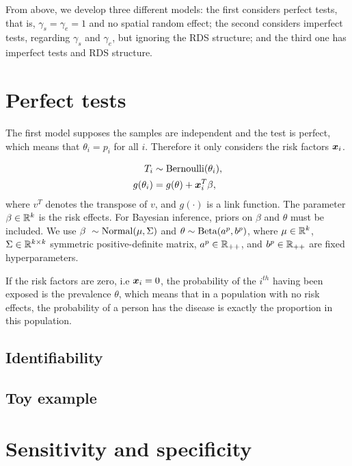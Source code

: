 From above, we develop three different models: the first considers perfect 
tests, that is, $\gamma_s = \gamma_e = 1$ and no spatial random effect; 
the second considers imperfect tests, regarding $\gamma_s$ and $\gamma_e$, 
but ignoring the RDS structure; and the third one has imperfect tests and 
RDS structure. 

\section{Perfect tests}

The first model supposes the samples are independent and the test is perfect,
which means that $\theta_i = p_i$ for all $i$. Therefore it only considers the risk factors $\boldsymbol{x}_i$. 

\begin{equation}
  \begin{aligned}
    T_i &\sim \operatorname{Bernoulli}(\theta_i), \\
    g(\theta_i) &= g(\theta) + \boldsymbol{x}_i^T\beta, 
  \end{aligned}  
\end{equation}
where $v^T$ denotes the transpose of $v$, and $g(\cdot)$ is a link function.
The parameter $\beta \in \mathbb{R}^{k}$ is the risk effects. For Bayesian inference, priors on
$\beta$ and $\theta$ must be included. We use $\beta ~ \sim \operatorname{Normal}(\mu, \Sigma)$
and $\theta \sim \operatorname{Beta}(a^{p}, b^p)$, where $\mu
\in \mathbb{R}^{k}$, $\Sigma \in \mathbb{R}^{k\times k}$ symmetric positive-definite matrix,
$a^p \in \mathbb{R}_{++}$, and $b^p \in \mathbb{R}_{++}$
are fixed hyperparameters. 

\begin{remark}
  If the risk factors are zero, i.e $\boldsymbol{x}_i = 0$, the probability of the
  $i^{th}$ having been exposed is the prevalence $\theta$, which means that in
  a population with no risk effects, the probability of a person has the
  disease is exactly the proportion in this population. 
\end{remark}

\subsection{Identifiability}

\subsection{Toy example}

\section{Sensitivity and specificity}

